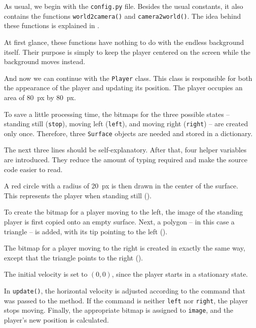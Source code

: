 As usual, we begin with the \texttt{config.py} file. Besides the usual constants, it also contains the functions \texttt{world2camera()} and \texttt{camera2world()}. The idea behind these functions is explained in .

At first glance, these functions have nothing to do with the endless background itself. Their purpose is simply to keep the player centered on the screen while the background moves instead.


And now we can continue with the \texttt{Player} class. This class is responsible for both the appearance of the player and updating its position. The player occupies an area of \SI{80}{px} by \SI{80}{px}.

To save a little processing time, the bitmaps for the three possible states -- standing still (\texttt{stop}), moving left (\texttt{left}), and moving right (\texttt{right}) -- are created only once. Therefore, three \texttt{Surface} objects are needed and stored in a dictionary.

The next three lines should be self-explanatory. After that, four helper variables are introduced. They reduce the amount of typing required and make the source code easier to read.

A red circle with a radius of \SI{20}{px} is then drawn in the center of the surface. This represents the player when standing still ().

To create the bitmap for a player moving to the left, the image of the standing player is first copied onto an empty surface. Next, a polygon -- in this case a triangle -- is added, with its tip pointing to the left ().

The bitmap for a player moving to the right is created in exactly the same way, except that the triangle points to the right ().

The initial velocity is set to $(0,0)$, since the player starts in a stationary state.

In \texttt{update()}, the horizontal velocity is adjusted according to the command that was passed to the method. If the command is neither \texttt{left} nor \texttt{right}, the player stops moving. Finally, the appropriate bitmap is assigned to \texttt{image}, and the player's new position is calculated.

